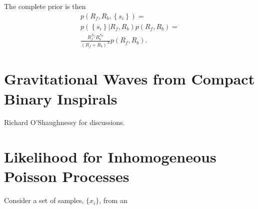 \documentclass[aps,prd,reprint]{revtex4-1}
\begin{document}
The complete prior is then
\begin{multline}
  p\left( R_f, R_b, \left\{ s_i \right\} \right) = \\ p\left( \left\{ s_i
  \right\} | R_f, R_b \right) p\left( R_f, R_b \right) = \\ \frac{R_f^{N_f} R_b^{N_b}}{\left( R_f
    + R_b\right)^N} p\left( R_f, R_b \right).
\end{multline}

\section{Gravitational Waves from Compact Binary Inspirals}
\label{sec:GW-example}

\begin{acknowledgments}
  Richard O'Shaughnessy for discussions.
\end{acknowledgments}

\appendix

\section{Likelihood for Inhomogeneous Poisson Processes}

Consider a set of samples, $\{ x_i \}$, from an 



\end{document}
